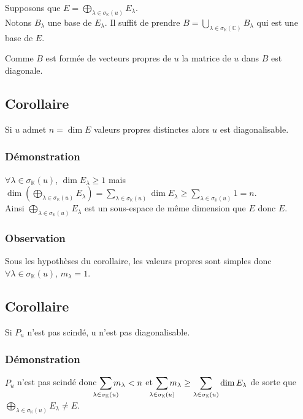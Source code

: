 \documentclass[a4paper,10pt]{book} %
\newcommand{\C}{\mathbb{C}}
\newcommand{\K}{\mathbb{K}}
\newcommand{\displayAmath}{\displaystyle}
\begin{document}
Supposons que $\displayAmath E=\bigoplus_{\lambda\in \sigma_{\K}(u)} E_\lambda$.\\
Notons $B_\lambda$ une base de $E_\lambda$. Il suffit de prendre $\displayAmath B=\bigcup_{\lambda\in \sigma_\K(\C)} B_\lambda$ qui est une base de $E$.

Comme $B$ est formée de vecteurs propres de $u$ la matrice de $u$ dans $B$ est diagonale.

\subsection{Corollaire}
Si $u$ admet $n=\dim E$ valeurs propres distinctes alors $u$ est diagonalisable.

\subsubsection{Démonstration}
$\forall \lambda\in \sigma_\K(u)$, $\dim E_\lambda\geq 1$ mais $\displayAmath \dim(\bigoplus_{\lambda\in \sigma_\K(u)} E_\lambda)=\sum_{\lambda\in \sigma_\K(u)}\dim E_\lambda\geq \sum_{\lambda\in \sigma_\K(u)}1=n$.\\

Ainsi $\displayAmath \bigoplus_{\lambda\in \sigma_\K(u)}E_\lambda$ est un sous-espace de même dimension que $E$ donc $E$.

\subsubsection{Observation}
Sous les hypothèses du corollaire, les valeurs propres sont simples donc $\forall \lambda\in \sigma_\K(u)$, $m_\lambda=1$.

\subsection{Corollaire}
Si $P_u$ n'est pas scindé, u n'est pas diagonalisable.

\subsubsection{Démonstration}
$P_u$ n'est pas scindé donc $\displayAmath \sum_{\mathclap{\lambda\in \sigma_{\K}(u)}}m_\lambda<n$ et $\displayAmath \sum_{\mathclap{\lambda\in \sigma_{\K}(u)}}m_\lambda\geq \sum_{\lambda\in \sigma_{\K}(u)}\dim E_\lambda$ de sorte que $\displayAmath \bigoplus_{\lambda\in \sigma_\K(u)} E_\lambda\neq E$.

\newpage
\end{document}
